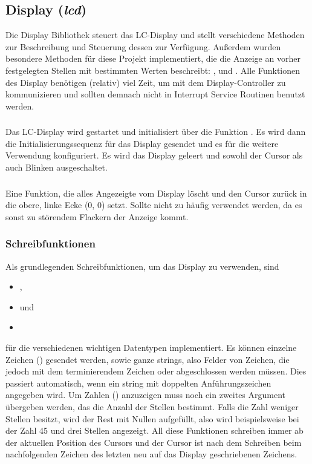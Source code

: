 \subsection{Display (\emph{lcd})}
Die Display Bibliothek steuert das LC-Display und stellt verschiedene Methoden zur Beschreibung und Steuerung dessen zur Verfügung.
Außerdem wurden besondere Methoden für diese Projekt implementiert, die die Anzeige an vorher festgelegten Stellen mit bestimmten Werten beschreibt: ,  und .
\newline
Alle Funktionen des Display benötigen (relativ) viel Zeit, um mit dem Display-Controller zu kommunizieren und sollten demnach nicht in Interrupt Service Routinen benutzt werden.
\subsubsection{}
Das LC-Display wird gestartet und initialisiert über die Funktion . Es wird dann die Initialisierungssequenz für das Display gesendet und es für die weitere Verwendung konfiguriert. Es wird das Display geleert und sowohl der Cursor als auch Blinken ausgeschaltet.
\subsubsection{}
Eine Funktion, die alles Angezeigte vom Display löscht und den Cursor zurück in die obere, linke Ecke (0, 0) setzt. Sollte nicht zu häufig verwendet werden, da es sonst zu störendem Flackern der Anzeige kommt.
\subsubsection{Schreibfunktionen}
Als grundlegenden Schreibfunktionen, um das Display zu verwenden, sind
\begin{itemize}
    \item {},
    \item {} und
    \item {}
\end{itemize}
für die verschiedenen wichtigen Datentypen implementiert. Es können einzelne Zeichen () gesendet werden, sowie ganze strings, also Felder von Zeichen, die jedoch mit dem terminierendem Zeichen  oder  abgeschlossen werden müssen. Dies passiert automatisch, wenn ein string mit doppelten Anführungszeichen angegeben wird. Um Zahlen () anzuzeigen muss noch ein zweites Argument übergeben werden, das die Anzahl der Stellen bestimmt. Falls die Zahl weniger Stellen besitzt, wird der Rest mit Nullen aufgefüllt, also wird beispielsweise bei der Zahl 45 und drei Stellen  angezeigt.
\newline
All diese Funktionen schreiben immer ab der aktuellen Position des Cursors und der Cursor ist nach dem Schreiben beim nachfolgenden Zeichen des letzten neu auf das Display geschriebenen Zeichens.

